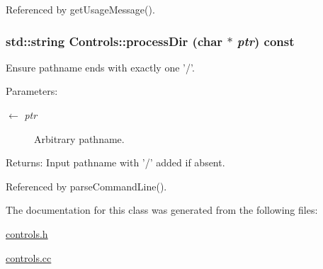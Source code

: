 Referenced by getUsageMessage().\hypertarget{classControls_8495fe7cdfa4cca8c820c591a99c9f8e}{
\subsubsection[processDir]{\setlength{\rightskip}{0pt plus 5cm}std::string Controls::processDir (char $\ast$ {\em ptr}) const}}
\label{classControls_8495fe7cdfa4cca8c820c591a99c9f8e}


Ensure pathname ends with exactly one '/'. \begin{Desc}
\item[Parameters:]
\begin{description}
\item[\mbox{$\leftarrow$} {\em ptr}]Arbitrary pathname. \end{description}
\end{Desc}
\begin{Desc}
\item[Returns:]Input pathname with '/' added if absent. \end{Desc}


Referenced by parseCommandLine().

The documentation for this class was generated from the following files:\begin{CompactItemize}
\item 
\hyperlink{controls_8h}{controls.h}\item 
\hyperlink{controls_8cc}{controls.cc}\end{CompactItemize}

